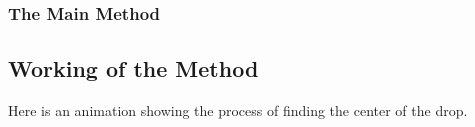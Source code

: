 \documentclass{beamer}
\begin{document}
\begin{frame}
    \frametitle{The Main Method}
    \subsection{Working of the Method}
    Here is an animation showing the process of finding the center of the drop.\\
    \centering
\end{frame}
\end{document}
